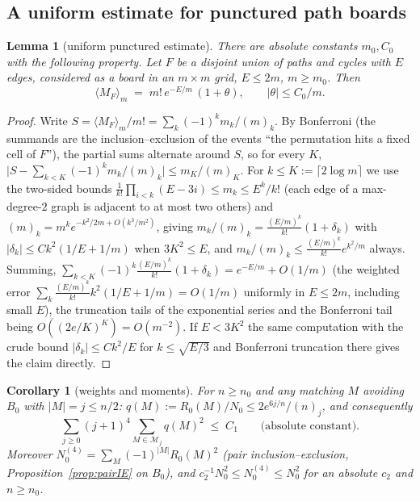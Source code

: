 \documentclass[11pt]{article}
\newtheorem{lemma}[theorem]{Lemma}
\newtheorem{corollary}[theorem]{Corollary}
\theoremstyle{definition}
\begin{document}
\subsection{A uniform estimate for punctured path boards}

\begin{lemma}[uniform punctured estimate]\label{lem:uniform}
There are absolute constants $m_0, C_0$ with the following property.
Let $F$ be a disjoint union of paths and cycles with $E$ edges,
considered as a board in an $m\times m$ grid, $E\le 2m$, $m\ge m_0$.  Then
\[
\langle M_F\rangle_m\;=\;m!\,e^{-E/m}\,(1+\theta),
\qquad |\theta|\le C_0/m .
\]
\end{lemma}

\begin{proof}
Write $S=\langle M_F\rangle_m/m!=\sum_k(-1)^k m_k/(m)_k$.  By Bonferroni
(the summands are the inclusion--exclusion of the events ``the
permutation hits a fixed cell of $F$''), the partial sums alternate
around $S$, so for every $K$,
$\bigl|S-\sum_{k<K}(-1)^km_k/(m)_k\bigr|\le m_K/(m)_K$.
For $k\le K:=\lceil2\log m\rceil$ we use the two-sided bounds
$\frac1{k!}\prod_{i<k}(E-3i)\le m_k\le E^k/k!$ (each edge of a
max-degree-$2$ graph is adjacent to at most two others) and
$(m)_k=m^ke^{-k^2/2m+O(k^3/m^2)}$, giving
$m_k/(m)_k=\frac{(E/m)^k}{k!}(1+\delta_k)$ with
$|\delta_k|\le Ck^2(1/E+1/m)$ when $3K^2\le E$, and
$m_k/(m)_k\le\frac{(E/m)^k}{k!}e^{k^2/m}$ always.  Summing,
$\sum_{k<K}(-1)^k\frac{(E/m)^k}{k!}(1+\delta_k)=e^{-E/m}+O(1/m)$
(the weighted error $\sum_k\frac{(E/m)^k}{k!}k^2(1/E+1/m)=O(1/m)$
uniformly in $E\le2m$, including small $E$), the truncation tails of the
exponential series and the Bonferroni tail being
$O((2e/K)^K)=O(m^{-2})$.  If $E<3K^2$ the same computation with the
crude bound $|\delta_k|\le Ck^2/E$ for $k\le\sqrt{E/3}$ and Bonferroni
truncation there gives the claim directly.
\end{proof}

\begin{corollary}[weights and moments]\label{cor:moments}
For $n\ge n_0$ and any matching $M$ avoiding $B_0$ with $|M|=j\le n/2$:
$q(M):=R_0(M)/N_0\le 2e^{6j/n}/(n)_j$, and consequently
\[
\sum_{j\ge0}(j+1)^4\!\!\sum_{M\in\mathcal M_j}\!q(M)^2\;\le\;C_1
\qquad\text{(absolute constant)} .
\]
Moreover $N^{(4)}_0=\sum_M(-1)^{|M|}R_0(M)^2$ (pair inclusion--exclusion,
Proposition~\ref{prop:pairIE} on $B_0$), and $c_2^{-1}N_0^2\le
N^{(4)}_0\le N_0^2$ for an absolute $c_2$ and $n\ge n_0$.
\end{corollary}
\end{document}
